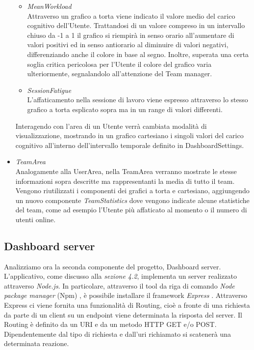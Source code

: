 \begin{itemize}
\begin{itemize}
    \item \emph{MeanWorkload}\\
    Attraverso un grafico a torta viene indicato il valore medio del carico cognitivo dell'Utente.\newline
    Trattandosi di un valore compreso in un intervallo chiuso da -1 a 1 il grafico si riempirà in senso orario all'aumentare di valori positivi ed in senso antiorario al diminuire di valori negativi, differenziando anche il colore in base al segno.\newline
    Inoltre, superata una certa soglia critica pericolosa per l'Utente il colore del grafico varia ulteriormente, segnalandolo all'attenzione del Team manager.
    \item \emph{SessionFatigue}\\
    L'affaticamento nella sessione di lavoro viene espresso attraverso lo stesso grafico a torta esplicato sopra ma in un range di valori differenti.
  \end{itemize}
  Interagendo con l'area di un Utente verrà cambiata modalità di visualizzazione, mostrando in un grafico cartesiano i singoli valori del carico cognitivo all'interno dell'intervallo temporale definito in DashboardSettings.\newline
  \item \emph{TeamArea}\\
  Analogamente alla UserArea, nella TeamArea verranno mostrate le stesse informazioni sopra descritte ma rappresentanti la media di tutto il team.\newline
  Vengono riutilizzati i componenti dei grafici a torta e cartesiano, aggiungendo un nuovo componente \emph{TeamStatistics} dove vengono indicate alcune statistiche del team, come ad esempio l'Utente più affaticato al momento o il numero di utenti online.
\end{itemize}
\subsection{Dashboard server}
Analizziamo ora la seconda componente del progetto, Dashboard server.\newline
L'applicativo, come discusso alla \emph{sezione 4.2}, implementa un server realizzato attraverso \emph{Node.js}.\newline
In particolare, attraverso il tool da riga di comando \emph{Node package manager} (Npm) \cite{npm}, è possibile installare il framework \emph{Express} \cite{express}.\newline
Attraverso Express ci viene fornita una funzionalità di Routing, cioè a fronte di una richiesta da parte di un client su un endpoint viene determinata la risposta del server.\newline
Il Routing è definito da un URI e da un metodo HTTP GET e/o POST. Dipendentemente dal tipo di richiesta e dall'uri richiamato si scatenerà una determinata reazione.
